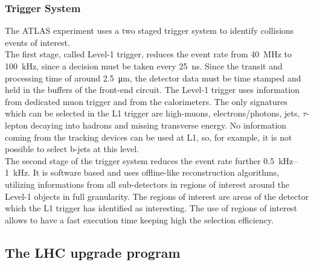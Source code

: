 \subsubsection{Trigger System}

The ATLAS experiment uses a two staged trigger system to identify collisions events of interest.\\
The first stage, called Level-1 trigger, reduces the event rate from \SI{40}{\mega\hertz} to \SI{100}{\kilo\hertz},
since a decision must be taken every \SI{25}{\nano\second}. Since the transit and processing time of around \SI{2.5}{\micro\meter}, the detector data must be time stamped and held in the buffers of the front-end circuit.
The Level-1 trigger uses information from dedicated muon trigger and from the calorimeters. The only signatures which can be selected in the L1 trigger are high-\pt muons, electrons/photons, jets, $\tau$-lepton decaying into hadrons and missing transverse energy. No information coming from the tracking devices can be used at L1, so, for example, it is not possible to select b-jets at this level.\\
The second stage of the trigger system reduces the event rate further \SIrange{0.5}{1}{\kilo\hertz}. It is software based and uses offline-like reconstruction algorithms, utilizing informations from all sub-detectors in regions of interest around the Level-1 objects in full granularity. The regions of interest are areas of the detector which the L1 trigger has identified as interesting. The use of regions of interest allows to have a fast execution time keeping high the selection efficiency.


\subsection{The LHC upgrade program}

